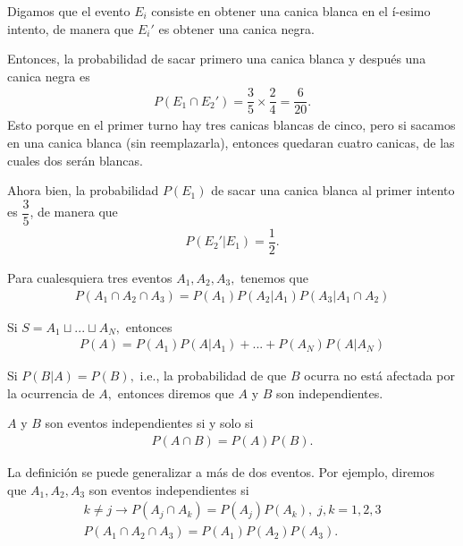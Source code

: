 \begin{solucion}
	Digamos que el evento $ E_i $ consiste en obtener una canica blanca en el í-esimo intento, de manera que $ E_i' $ es obtener una canica negra. 
	
	Entonces, la probabilidad de sacar primero una canica blanca y después una canica negra es 
	\begin{align}
		P(E_1\cap E_2') = \dfrac{3}{5}\times \dfrac{2}{4}=\dfrac{6}{20}.
	\end{align}
	Esto porque en el primer turno hay tres canicas blancas de cinco, pero si sacamos en una canica blanca (sin reemplazarla), entonces quedaran cuatro canicas, de las cuales dos serán blancas. 
	
	Ahora bien, la probabilidad $ P(E_1) $ de sacar una canica blanca al primer intento es $ \dfrac{3}{5} $, de manera que 
	\begin{align}
		P(E_2'|E_1) = \dfrac{1}{2}.
	\end{align}
\end{solucion}





{}
\begin{teorema}
	\label{thm:2.4.1}
	Para cualesquiera tres eventos $A_{1},A_{2},A_{3},$ tenemos que
	\begin{align}
		\label{eq:2.4.1}
		P(A_{1} \cap A_{2} \cap A_{3})=P(A_{1})P(A_{2}|A_{1})P(A_{3}|A_{1} \cap A_{2})
	\end{align}
\end{teorema}


{}
\begin{teorema}
	\label{thm:2.4.2} Si $S=A_{1}\sqcup ... \sqcup A_{N},$  entonces
	\begin{align}
		\label{eq:2.4.2}
		P(A)=P(A_{1})P(A|A_{1})+...+P(A_{N})P(A|A_{N})
	\end{align}
\end{teorema}


{}
Si $P(B|A)=P(B),$ i.e., la probabilidad de que $B$ ocurra no está afectada por la ocurrencia de $A,$ entonces diremos que $A$ y $B$ son independientes.


\begin{definicion}
	$A$ y $B$ son eventos independientes si y solo si
	\begin{align}
		\label{eq:2.4.3}
		P(A \cap B) = P(A)P(B).
	\end{align}
\end{definicion}


{}
La definición se puede generalizar a más de dos eventos.  Por ejemplo, diremos que $A_{1},A_{2},A_{3}$ son eventos independientes si
\begin{align}
	k\neq j \rightarrow P(A_{j} \cap A_{k})=P(A_{j})P(A_{k}), \; j,k=1,2,3 
	\\ P(A_{1}\cap A_{2} \cap A_{3})=P(A_{1})P(A_{2})P(A_{3}).
\end{align}


%	




